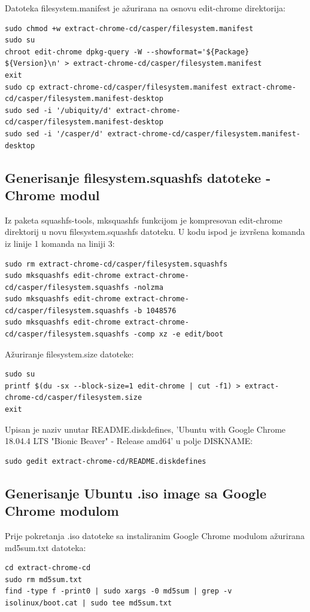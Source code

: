 \documentclass[12pt,vi]{mitthesis}
\begin{document}
\noindent
Datoteka filesystem.manifest je ažurirana na osnovu edit-chrome direktorija:
\begin{lstlisting}[style=BashInputStyle]
sudo chmod +w extract-chrome-cd/casper/filesystem.manifest
sudo su
chroot edit-chrome dpkg-query -W --showformat='${Package} ${Version}\n' > extract-chrome-cd/casper/filesystem.manifest
exit
sudo cp extract-chrome-cd/casper/filesystem.manifest extract-chrome-cd/casper/filesystem.manifest-desktop
sudo sed -i '/ubiquity/d' extract-chrome-cd/casper/filesystem.manifest-desktop
sudo sed -i '/casper/d' extract-chrome-cd/casper/filesystem.manifest-desktop
\end{lstlisting}

\subsection*{Generisanje filesystem.squashfs datoteke - Chrome modul}
\noindent
Iz paketa squashfs-tools, mksquashfs funkcijom je kompresovan edit-chrome direktorij u novu filesystem.squashfs datoteku. U kodu ispod je izvršena komanda iz linije 1 komanda na liniji 3:
\begin{lstlisting}[style=BashInputStyle]
sudo rm extract-chrome-cd/casper/filesystem.squashfs
sudo mksquashfs edit-chrome extract-chrome-cd/casper/filesystem.squashfs -nolzma 
sudo mksquashfs edit-chrome extract-chrome-cd/casper/filesystem.squashfs -b 1048576
sudo mksquashfs edit-chrome extract-chrome-cd/casper/filesystem.squashfs -comp xz -e edit/boot
\end{lstlisting}

\noindent
Ažuriranje filesystem.size datoteke:
\begin{lstlisting}[style=BashInputStyle]
sudo su
printf $(du -sx --block-size=1 edit-chrome | cut -f1) > extract-chrome-cd/casper/filesystem.size
exit
\end{lstlisting}

\noindent
Upisan je naziv unutar README.diskdefines, 'Ubuntu with Google Chrome 18.04.4 LTS "Bionic Beaver" - Release amd64' u polje DISKNAME:
\begin{lstlisting}[style=BashInputStyle]
sudo gedit extract-chrome-cd/README.diskdefines
\end{lstlisting}

\subsection*{Generisanje Ubuntu .iso image sa Google Chrome modulom}
\noindent
Prije pokretanja .iso datoteke sa instaliranim Google Chrome modulom ažurirana md5sum.txt datoteka:
\begin{lstlisting}[style=BashInputStyle]
cd extract-chrome-cd
sudo rm md5sum.txt
find -type f -print0 | sudo xargs -0 md5sum | grep -v isolinux/boot.cat | sudo tee md5sum.txt
\end{lstlisting}
\end{document}
